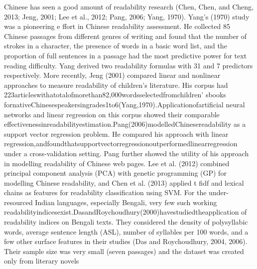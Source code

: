\documentclass[9pt]{article}
\begin{document}
Chinese has seen a good amount of readability research (Chen, Chen, and Cheng, 2013; Jeng, 2001; Lee et al., 2012; Pang, 2006; Yang, 1970). Yang’s (1970) study was a pioneering e ﬀort in Chinese readability assessment. He collected 85 Chinese passages from diﬀerent genres of writing and found that the number of strokes in a character, the presence of words in a basic word list, and the proportion of full sentences in a passage had the most predictive power for text reading diﬃculty. Yang derived two readability formulas with 31 and 7 predictors respectively. More recently, Jeng (2001) compared linear and nonlinear approaches to measure readability of children’s literature. His corpus had 223articleswithatotalofmorethan82,000wordsselectedfromchildren’ sbooks fornativeChinesespeakersingrades1to6(Yang,1970).Applicationofartiﬁcial neural networks and linear regression on this corpus showed their comparable eﬀectivenessinreadabilityestimation.Pang(2006)modelledChinesereadability as a support vector regression problem. He compared his approach with linear regression,andfoundthatsupportvectorregressionoutperformedlinearregression under a cross-validation setting. Pang further showed the utility of his approach in modelling readability of Chinese web pages. Lee et al. (2012) combined principal component analysis (PCA) with genetic programming (GP) for modelling Chinese readability, and Chen et al. (2013) applied t ﬁdf and lexical chains as features for readability classiﬁcation using SVM. For the under-resourced Indian languages, especially Bengali, very few such working readabilityindicesexist.DasandRoychoudhury(2000)havestudiedtheapplication of readability indices on Bengali texts. They considered the density of polysyllabic words, average sentence length (ASL), number of syllables per 100 words, and a few other surface features in their studies (Das and Roychoudhury, 2004, 2006). Their sample size was very small (seven passages) and the dataset was created only from literary novels\\
\end{document}
